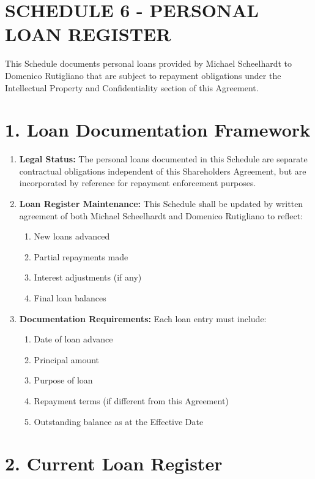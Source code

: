 \section*{SCHEDULE 6 - PERSONAL LOAN REGISTER}

This Schedule documents personal loans provided by Michael Scheelhardt to Domenico Rutigliano that are subject to repayment obligations under the Intellectual Property and Confidentiality section of this Agreement.

\section*{1. Loan Documentation Framework}

\begin{enumerate}[label=\arabic*.]
\item \textbf{Legal Status:} The personal loans documented in this Schedule are separate contractual obligations independent of this Shareholders Agreement, but are incorporated by reference for repayment enforcement purposes.

\item \textbf{Loan Register Maintenance:} This Schedule shall be updated by written agreement of both Michael Scheelhardt and Domenico Rutigliano to reflect:
    \begin{enumerate}[label=(\alph*)]
    \item New loans advanced
    \item Partial repayments made
    \item Interest adjustments (if any)
    \item Final loan balances
    \end{enumerate}

\item \textbf{Documentation Requirements:} Each loan entry must include:
    \begin{enumerate}[label=(\alph*)]
    \item Date of loan advance
    \item Principal amount
    \item Purpose of loan
    \item Repayment terms (if different from this Agreement)
    \item Outstanding balance as at the Effective Date
    \end{enumerate}
\end{enumerate}

\section*{2. Current Loan Register}

